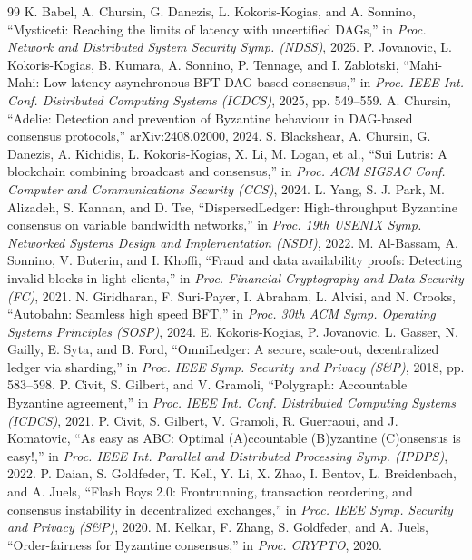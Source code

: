 \documentclass[UTF8,fontset=windows,a4paper,11pt]{ctexart}
\begin{document}
\begin{thebibliography}{99}
 K. Babel, A. Chursin, G. Danezis, L. Kokoris-Kogias, and A. Sonnino, “Mysticeti: Reaching the limits of latency with uncertified DAGs,” in \textit{Proc. Network and Distributed System Security Symp. (NDSS)}, 2025.
 P. Jovanovic, L. Kokoris-Kogias, B. Kumara, A. Sonnino, P. Tennage, and I. Zablotski, “Mahi-Mahi: Low-latency asynchronous BFT DAG-based consensus,” in \textit{Proc. IEEE Int. Conf. Distributed Computing Systems (ICDCS)}, 2025, pp. 549–559.
 A. Chursin, “Adelie: Detection and prevention of Byzantine behaviour in DAG-based consensus protocols,” arXiv:2408.02000, 2024.
 S. Blackshear, A. Chursin, G. Danezis, A. Kichidis, L. Kokoris-Kogias, X. Li, M. Logan, et al., “Sui Lutris: A blockchain combining broadcast and consensus,” in \textit{Proc. ACM SIGSAC Conf. Computer and Communications Security (CCS)}, 2024.
 L. Yang, S. J. Park, M. Alizadeh, S. Kannan, and D. Tse, “DispersedLedger: High-throughput Byzantine consensus on variable bandwidth networks,” in \textit{Proc. 19th USENIX Symp. Networked Systems Design and Implementation (NSDI)}, 2022.
 M. Al-Bassam, A. Sonnino, V. Buterin, and I. Khoffi, “Fraud and data availability proofs: Detecting invalid blocks in light clients,” in \textit{Proc. Financial Cryptography and Data Security (FC)}, 2021.
 N. Giridharan, F. Suri-Payer, I. Abraham, L. Alvisi, and N. Crooks, “Autobahn: Seamless high speed BFT,” in \textit{Proc. 30th ACM Symp. Operating Systems Principles (SOSP)}, 2024.
 E. Kokoris-Kogias, P. Jovanovic, L. Gasser, N. Gailly, E. Syta, and B. Ford, “OmniLedger: A secure, scale-out, decentralized ledger via sharding,” in \textit{Proc. IEEE Symp. Security and Privacy (S\&P)}, 2018, pp. 583–598.
 P. Civit, S. Gilbert, and V. Gramoli, “Polygraph: Accountable Byzantine agreement,” in \textit{Proc. IEEE Int. Conf. Distributed Computing Systems (ICDCS)}, 2021.
 P. Civit, S. Gilbert, V. Gramoli, R. Guerraoui, and J. Komatovic, “As easy as ABC: Optimal (A)ccountable (B)yzantine (C)onsensus is easy!,” in \textit{Proc. IEEE Int. Parallel and Distributed Processing Symp. (IPDPS)}, 2022.
 P. Daian, S. Goldfeder, T. Kell, Y. Li, X. Zhao, I. Bentov, L. Breidenbach, and A. Juels, “Flash Boys 2.0: Frontrunning, transaction reordering, and consensus instability in decentralized exchanges,” in \textit{Proc. IEEE Symp. Security and Privacy (S\&P)}, 2020.
 M. Kelkar, F. Zhang, S. Goldfeder, and A. Juels, “Order-fairness for Byzantine consensus,” in \textit{Proc. CRYPTO}, 2020.

\end{thebibliography}
\end{document}
